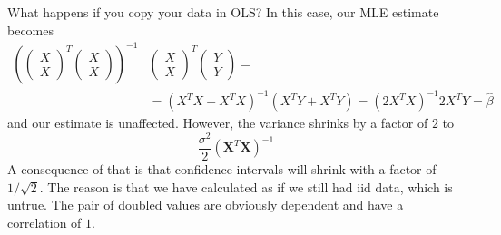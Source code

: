   \begin{example}
    What happens if you copy your data in OLS? In this case, our MLE estimate becomes 
    \begin{align*}
        \left(\begin{pmatrix}X \\ X \end{pmatrix}^T \begin{pmatrix} X \\ X \end{pmatrix} \right )^{-1} & \begin{pmatrix} X \\ X  \end{pmatrix}^T \begin{pmatrix} Y \\ Y  \end{pmatrix}  =\\
    & = (X^T X + X^T X)^{-1} (X^T Y + X^T Y ) = (2 X^T X)^{-1} 2 X^T Y = \hat{\beta}
    \end{align*}
    and our estimate is unaffected. However, the variance shrinks by a factor of $2$ to 
    \begin{equation}
      \frac{\sigma^2}{2} (\mathbf{X}^T \mathbf{X})^{-1}
    \end{equation}
    A consequence of that is that confidence intervals will shrink with a factor of $1/\sqrt{2}$. The reason is that we have calculated as if we still had iid data, which is untrue. The pair of doubled values are obviously dependent and have a correlation of $1$. 
  \end{example}

